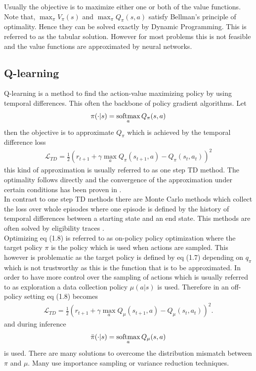 \noindent Usually the objective is to maximize either one or both of the value functions.
Note that, $\max_{\pi}V_{\pi}(s)$ and $\max_{\pi}Q_{\pi}(s, a)$ satisfy Bellman's principle of optimality. Hence they can be solved exactly by Dynamic Programming. This is referred to as the tabular solution. However for most problems this is not feasible and the value functions are approximated by neural networks. \\

\subsection{Q-learning}
Q-learning is a method to find the action-value maximizing policy by using temporal differences. This often the backbone of policy gradient algorithms. Let
\begin{align}
\pi(\cdot|s) = \operatorname*{softmax}_{a}Q_{\pi}(s, a)
\end{align}
then the objective is to approximate $Q_{\pi}$ which is achieved by the temporal difference loss
\begin{align}
\mathcal{L}_{TD} = \frac{1}{2} \left(r_{t+1} + \gamma \max_{a}Q_{\pi}(s_{t+1}, a) - Q_{\pi}(s_t, a_t)\right)^2
\end{align}
this kind of approximation is usually referred to as one step TD method. The optimality follows directly and the convergence of the approximation under certain conditions has been proven in \cite{SBQL}.\\
In contrast to one step TD methods there are Monte Carlo methods which collect the loss over whole episodes where one episode is defined by the history of temporal differences between a starting state and an end state. This methods are often solved by eligibility traces \cite{SBeligibility}. \\
Optimizing eq (1.8) is referred to as on-policy policy optimization where the target policy $\pi$ is the policy which is used when actions are sampled. This however is problematic as the target policy is defined by eq (1.7) depending on $q_{\pi}$ which is not trustworthy as this is the function that is to be approximated. In order to have more control over the sampling of actions which is usually referred to as exploration a data collection policy $\mu(a|s)$ is used. Therefore in an off-policy setting eq (1.8) becomes
\begin{align}
\mathcal{L}_{TD} = \frac{1}{2} \left(r_{t+1} + \gamma \max_{a}Q_{\mu}(s_{t+1}, a) - Q_{\mu}(s_t, a_t)\right)^2\text{.}
\end{align}
and during inference 
\begin{align}
\bar{\pi}(\cdot|s) = \operatorname*{softmax}_{a}Q_{\mu}(s, a)
\end{align}
is used. There are many solutions to overcome the distribution mismatch between $\pi$ and $\mu$. Many use importance sampling or variance reduction techniques.\cite{liu2018breaking}

